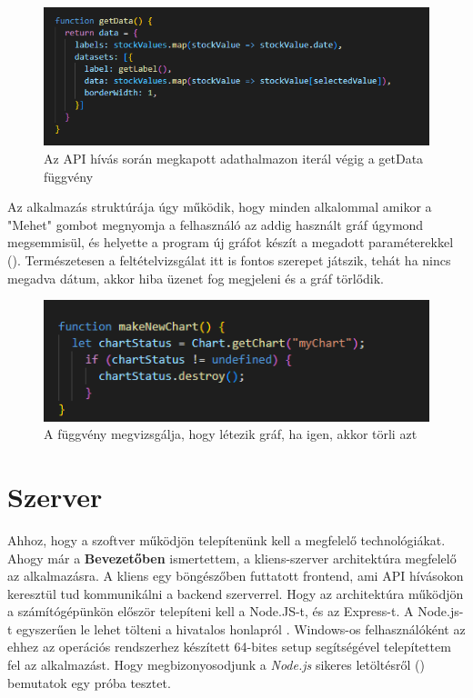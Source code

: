 \begin{figure}[h]
\centering
\includegraphics[scale=0.8]{images/chartData.png}
\caption{Az API hívás során megkapott adathalmazon iterál végig a getData függvény}
\label{fig:chartData}
\end{figure}

Az alkalmazás struktúrája úgy működik, hogy minden alkalommal amikor a "Mehet" gombot megnyomja a felhasználó az addig használt gráf úgymond megsemmisül, és helyette a program új gráfot készít a megadott paraméterekkel (). Természetesen a feltételvizsgálat itt is fontos szerepet játszik, tehát ha nincs megadva dátum, akkor hiba üzenet fog megjeleni és a gráf törlődik.

\begin{figure}[h]
\centering
\includegraphics[scale=0.8]{images/makeNew.png}
\caption{A függvény megvizsgálja, hogy létezik gráf, ha igen, akkor törli azt}
\label{fig:newChart}
\end{figure}

\section{Szerver \label{fig:server}}

Ahhoz, hogy a szoftver működjön telepítenünk kell a megfelelő technológiákat. Ahogy már a \textbf{Bevezetőben} ismertettem, a kliens-szerver architektúra megfelelő az alkalmazásra. A kliens egy böngészőben futtatott frontend, ami API hívásokon keresztül tud kommunikálni a backend szerverrel.
Hogy az architektúra működjön a számítógépünkön először telepíteni kell a Node.JS-t, és az Express-t. A Node.js-t egyszerűen le lehet tölteni a hivatalos honlapról \cite{nodeJS}. Windows-os felhasználóként az ehhez az operációs rendszerhez készített 64-bites setup segítségével telepítettem fel az alkalmazást. Hogy megbizonyosodjunk a \emph{Node.js} sikeres letöltésről () bemutatok egy próba tesztet.

